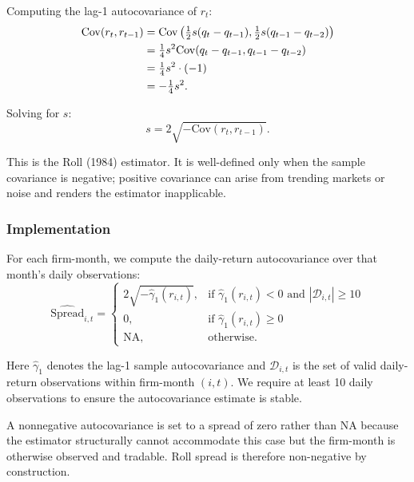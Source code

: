 Computing the lag-1 autocovariance of \(r_t\):
\begin{align}
\mathrm{Cov}(r_t, r_{t-1})
&= \mathrm{Cov}\left(\tfrac{1}{2} s (q_t - q_{t-1}),
                    \tfrac{1}{2} s (q_{t-1} - q_{t-2})\right) \notag\\
&= \tfrac{1}{4} s^2 \mathrm{Cov}(q_t - q_{t-1}, q_{t-1} - q_{t-2}) \notag\\
&= \tfrac{1}{4} s^2 \cdot (-1) \notag\\
&= -\tfrac{1}{4} s^2.
\label{eq:roll-cov}
\end{align}

Solving for \(s\):
\begin{equation}
s = 2 \sqrt{-\mathrm{Cov}(r_t, r_{t-1})}.
\label{eq:roll-spread}
\end{equation}

This is the Roll (1984) estimator. It is well-defined only when the
sample covariance is negative; positive covariance can arise from
trending markets or noise and renders the estimator inapplicable.

\subsubsection{Implementation}

For each firm-month, we compute the daily-return autocovariance over
that month's daily observations:
\begin{equation}
\widehat{\mathrm{Spread}}_{i,t} =
\begin{cases}
2 \sqrt{-\widehat{\gamma}_1(r_{i,t})}, &
   \text{if } \widehat{\gamma}_1(r_{i,t}) < 0
   \text{ and } |\mathcal{D}_{i,t}| \ge 10 \\
0, & \text{if } \widehat{\gamma}_1(r_{i,t}) \ge 0 \\
\text{NA}, & \text{otherwise.}
\end{cases}
\label{eq:roll-impl}
\end{equation}

Here \(\widehat{\gamma}_1\) denotes the lag-1 sample autocovariance and
\(\mathcal{D}_{i,t}\) is the set of valid daily-return observations
within firm-month \((i,t)\). We require at least 10 daily observations
to ensure the autocovariance estimate is stable.

A nonnegative autocovariance is set to a spread of zero rather than NA
because the estimator structurally cannot accommodate this case but the
firm-month is otherwise observed and tradable. Roll spread is therefore
non-negative by construction.

